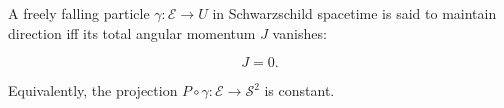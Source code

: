 A freely falling particle $\gamma: \mathcal{E} \rightarrow U$ in Schwarzschild spacetime is said to maintain direction iff its total angular momentum $J$ vanishes:

$$J = 0.$$

Equivalently, the projection $P \circ \gamma: \mathcal{E} \rightarrow \mathcal{S}^2$ is constant.